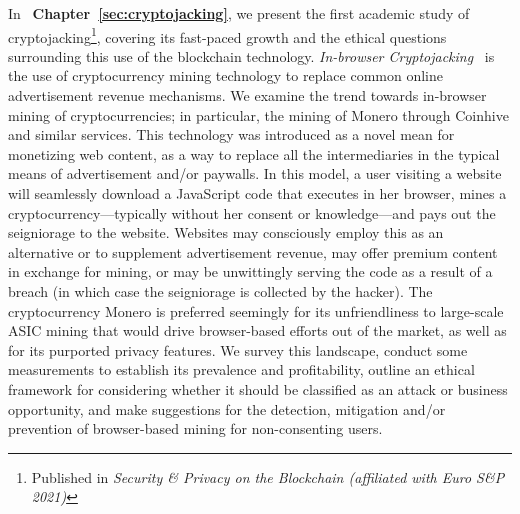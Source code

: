 In ~\textbf{Chapter~\ref{sec:cryptojacking}}, we present the first academic study of cryptojacking\footnote{Published in \textit{Security {\&} Privacy on the Blockchain (affiliated with Euro S{\&}P 2021)}}, covering its fast-paced growth and the ethical questions surrounding this use of the blockchain technology. \textit{In-browser Cryptojacking}~\cite{eskandari2018first} is the use of cryptocurrency mining technology to replace common online advertisement revenue mechanisms. We examine the trend towards in-browser mining of cryptocurrencies; in particular, the mining of Monero through Coinhive and similar services. This technology was introduced as a novel mean for monetizing web content, as a way to replace all the intermediaries in the typical means of advertisement and/or paywalls. In this model, a user visiting a website will seamlessly download a JavaScript code that executes in her browser, mines a cryptocurrency---typically without her consent or knowledge---and pays out the seigniorage to the website. Websites may consciously employ this as an alternative or to supplement advertisement revenue, may offer premium content in exchange for mining, or may be unwittingly serving the code as a result of a breach (in which case the seigniorage is collected by the hacker). The cryptocurrency Monero is preferred seemingly for its unfriendliness to large-scale ASIC mining that would drive browser-based efforts out of the market, as well as for its purported privacy features. We survey this landscape, conduct some measurements to establish its prevalence and profitability, outline an ethical framework for considering whether it should be classified as an attack or business opportunity, and make suggestions for the detection, mitigation and/or prevention of browser-based mining for non-consenting users.


